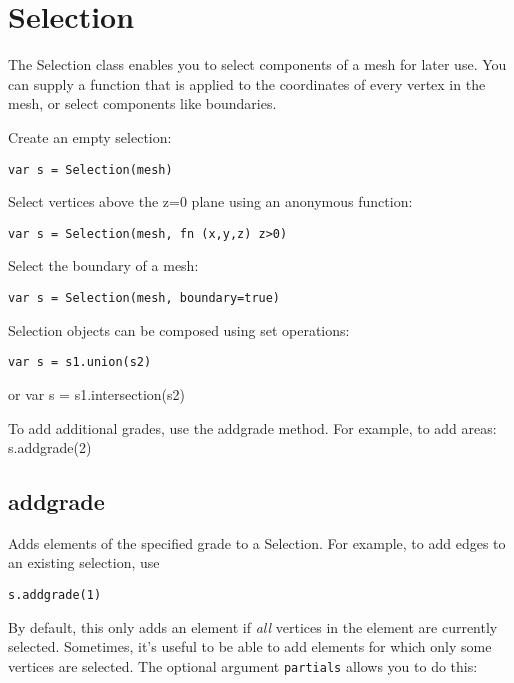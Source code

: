 \hypertarget{selection}{%
\section{Selection}\label{selection}}

The Selection class enables you to select components of a mesh for later
use. You can supply a function that is applied to the coordinates of
every vertex in the mesh, or select components like boundaries.

Create an empty selection:

\begin{lstlisting}
var s = Selection(mesh)
\end{lstlisting}

Select vertices above the z=0 plane using an anonymous function:

\begin{lstlisting}
var s = Selection(mesh, fn (x,y,z) z>0)
\end{lstlisting}

Select the boundary of a mesh:

\begin{lstlisting}
var s = Selection(mesh, boundary=true)
\end{lstlisting}

Selection objects can be composed using set operations:

\begin{lstlisting}
var s = s1.union(s2)
\end{lstlisting}

or var s = s1.intersection(s2)

To add additional grades, use the addgrade method. For example, to add
areas: s.addgrade(2)

\hypertarget{addgrade}{%
\subsection{addgrade}\label{addgrade}}

Adds elements of the specified grade to a Selection. For example, to add
edges to an existing selection, use

\begin{lstlisting}
s.addgrade(1)
\end{lstlisting}

By default, this only adds an element if \emph{all} vertices in the
element are currently selected. Sometimes, it's useful to be able to add
elements for which only some vertices are selected. The optional
argument \texttt{partials} allows you to do this:

